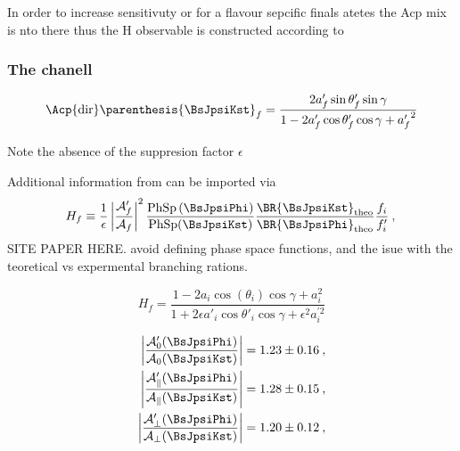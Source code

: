 In order to increase sensitivuty or for a flavour sepcific finals atetes the Acp mix is nto there thus the H observable is constructed
according to

\subsubsection{The \BsJpsiKst chanell}

\begin{equation}
  \Acp{\rm dir}\parenthesis{\BsJpsiKst}_f = \frac{ 2a'_f \sin\theta'_f \sin\gamma} {1 - 2a'_f \cos\theta'_f \cos\gamma +  {a'_f}^{2}}
  \label{bsjpsikst_peng_acp_obs}
\end{equation}

Note the absence of the suppresion factor $\epsilon$

Additional information from \BsJpsiKst can be imported via
\begin{equation}
  H_f \equiv \frac{1}{\epsilon} \left|\frac{\mathcal{A}'_f}{\mathcal{A}_f}\right|^2
  \frac{\text{PhSp}\left(\BsJpsiPhi\right)}{\text{PhSp}(\BsJpsiKst)}
  \frac{\BR{\BsJpsiKst}_{\text{theo}}}{\BR{\BsJpsiPhi}_{\text{theo}}}
  \frac{f_i}{f'_i}\:,  \\
\label{bsjpsikst_Hobs_def}
\end{equation}
{\color{red} SITE PAPER HERE. avoid defining phase space functions, and the isue with the teoretical vs expermental branching rations.}


\begin{equation}
  H_f = \frac{1-2a_i \cos(\theta_i) \cos\gamma+a_i^{2}}{1+2\epsilon a'_i \cos\theta'_i\cos\gamma +\epsilon^2 a_i^{\prime 2}}
\label{bsjpsikst_Hobs_param}
\end{equation}

\begin{align}
\left|\frac{\mathcal{A}'_0(\BsJpsiPhi)}{\mathcal{A}_0(\BsJpsiKst)}\right| & = 1.23 \pm 0.16\:,\label{Eq:AmpRat_JpsiKstar_long}\\
\left|\frac{\mathcal{A}'_{\parallel}(\BsJpsiPhi)}{\mathcal{A}_{\parallel}(\BsJpsiKst)}\right| & = 1.28 \pm 0.15\:,\\
\left|\frac{\mathcal{A}'_{\perp}(\BsJpsiPhi)}{\mathcal{A}_{\perp}(\BsJpsiKst)}\right| & = 1.20 \pm 0.12\:,\label{Eq:AmpRat_JpsiKstar_perp}
\end{align}


